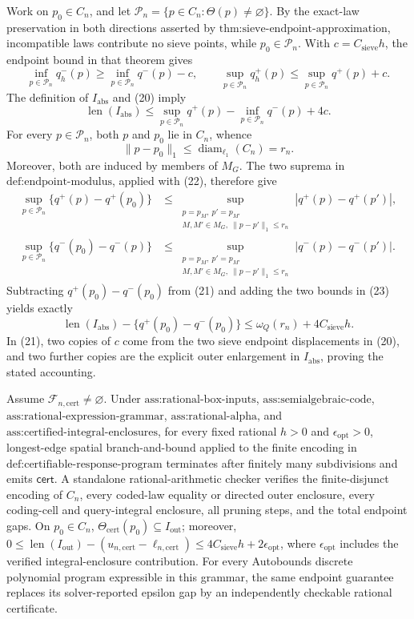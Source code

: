Work on \(p_0\in C_n\), and let \(\mathcal P_n=\{p\in C_n:\Theta(p)\ne\varnothing\}\).  By the exact-law preservation in both directions asserted by \(\text{thm:sieve-endpoint-approximation}\), incompatible laws contribute no sieve points, while \(p_0\in\mathcal P_n\).  With \(c=C_{\mathrm{sieve}}h\), the endpoint bound in that theorem gives
\[
\inf_{p\in\mathcal P_n}q_h^-(p)\geq\inf_{p\in\mathcal P_n}q^-(p)-c,
\qquad
\sup_{p\in\mathcal P_n}q_h^+(p)\leq\sup_{p\in\mathcal P_n}q^+(p)+c. \tag{20}
\]
The definition of \(I_{\mathrm{abs}}\) and (20) imply
\[
\operatorname{len}(I_{\mathrm{abs}})
\leq \sup_{p\in\mathcal P_n}q^+(p)-\inf_{p\in\mathcal P_n}q^-(p)+4c. \tag{21}
\]
For every \(p\in\mathcal P_n\), both \(p\) and \(p_0\) lie in \(C_n\), whence
\[
\lVert p-p_0\rVert_1\leq\operatorname{diam}_{\ell_1}(C_n)=r_n. \tag{22}
\]
Moreover, both are induced by members of \(M_G\).  The two suprema in \(\text{def:endpoint-modulus}\), applied with (22), therefore give
\[
\begin{aligned}
\sup_{p\in\mathcal P_n}\{q^+(p)-q^+(p_0)\}
&\leq \sup_{\substack{p=p_M,\ p'=p_{M'}\\M,M'\in M_G,\ \lVert p-p'\rVert_1\leq r_n}}
 |q^+(p)-q^+(p')|,\\
\sup_{p\in\mathcal P_n}\{q^-(p_0)-q^-(p)\}
&\leq \sup_{\substack{p=p_M,\ p'=p_{M'}\\M,M'\in M_G,\ \lVert p-p'\rVert_1\leq r_n}}
 |q^-(p)-q^-(p')|.
\end{aligned}                                                       \tag{23}
\]
Subtracting \(q^+(p_0)-q^-(p_0)\) from (21) and adding the two bounds in (23) yields exactly
\[
\operatorname{len}(I_{\mathrm{abs}})-\{q^+(p_0)-q^-(p_0)\}
\leq\omega_Q(r_n)+4C_{\mathrm{sieve}}h.
\]
In (21), two copies of \(c\) come from the two sieve endpoint displacements in (20), and two further copies are the explicit outer enlargement in \(I_{\mathrm{abs}}\), proving the stated accounting.

Assume \(\mathcal F_{n,\mathrm{cert}}\ne\varnothing\).  Under \(\text{ass:rational-box-inputs}\), \(\text{ass:semialgebraic-code}\), \(\text{ass:rational-expression-grammar}\), \(\text{ass:rational-alpha}\), and \(\text{ass:certified-integral-enclosures}\), for every fixed rational \(h>0\) and \(\epsilon_{\mathrm{opt}}>0\), longest-edge spatial branch-and-bound applied to the finite encoding in \(\text{def:certifiable-response-program}\) terminates after finitely many subdivisions and emits \(\mathsf{cert}\). A standalone rational-arithmetic checker verifies the finite-disjunct encoding of \(C_n\), every coded-law equality or directed outer enclosure, every coding-cell and query-integral enclosure, all pruning steps, and the total endpoint gaps. On \(p_0\in C_n\), \(\Theta_{\mathrm{cert}}(p_0)\subseteq I_{\mathrm{out}}\); moreover, \(0\le\operatorname{len}(I_{\mathrm{out}})-(u_{n,\mathrm{cert}}-\ell_{n,\mathrm{cert}})\le4C_{\mathrm{sieve}}h+2\epsilon_{\mathrm{opt}}\), where \(\epsilon_{\mathrm{opt}}\) includes the verified integral-enclosure contribution. For every Autobounds discrete polynomial program expressible in this grammar, the same endpoint guarantee replaces its solver-reported epsilon gap by an independently checkable rational certificate.

